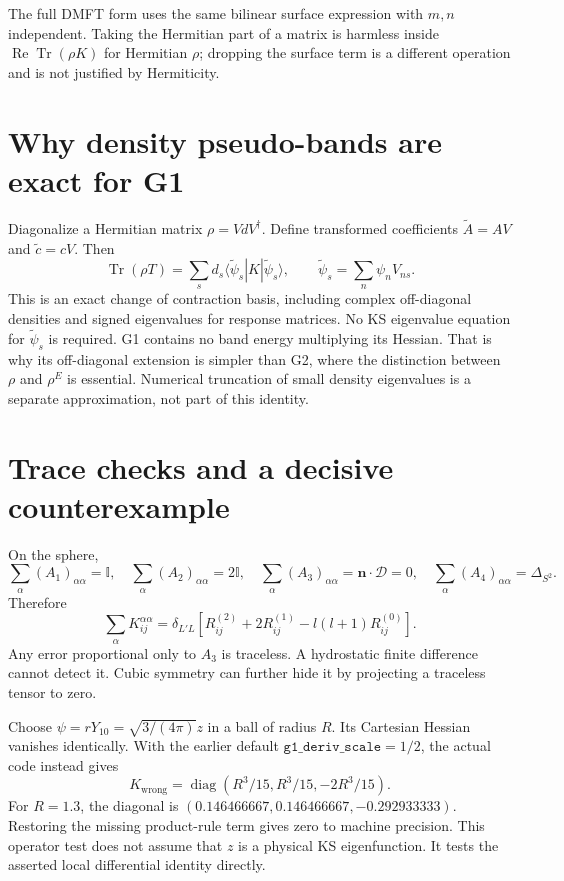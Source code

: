 \documentclass[11pt]{article}
\newcommand{\Tr}{\operatorname{Tr}}
\newcommand{\Rea}{\operatorname{Re}}
\newcommand{\Id}{\mathbb I}
\begin{document}
The full DMFT form uses the same bilinear surface expression with $m,n$ independent. Taking the Hermitian part of a matrix is harmless inside $\Rea\Tr(\rho K)$ for Hermitian $\rho$; dropping the surface term is a different operation and is not justified by Hermiticity.

\section{Why density pseudo-bands are exact for G1}
Diagonalize a Hermitian matrix $\rho=V d V^\dagger$. Define transformed coefficients $\widetilde A=AV$ and $\widetilde c=cV$. Then
\begin{equation}
 \Tr(\rho T)=\sum_s d_s\langle\widetilde\psi_s|\hat K|\widetilde\psi_s\rangle,
 \qquad \widetilde\psi_s=\sum_n\psi_n V_{ns}.
\end{equation}
This is an exact change of contraction basis, including complex off-diagonal densities and signed eigenvalues for response matrices. No KS eigenvalue equation for $\widetilde\psi_s$ is required. G1 contains no band energy multiplying its Hessian. That is why its off-diagonal extension is simpler than G2, where the distinction between $\rho$ and $\rho^E$ is essential. Numerical truncation of small density eigenvalues is a separate approximation, not part of this identity.

\section{Trace checks and a decisive counterexample}
On the sphere,
\begin{equation}
 \sum_\alpha(A_1)_{\alpha\alpha}=\Id,\quad
 \sum_\alpha(A_2)_{\alpha\alpha}=2\Id,\quad
 \sum_\alpha(A_3)_{\alpha\alpha}=\bm n\cdot\bm{\mathcal D}=0,\quad
 \sum_\alpha(A_4)_{\alpha\alpha}=\Delta_{S^2}.
\end{equation}
Therefore
\begin{equation}
 \sum_\alpha K^{\alpha\alpha}_{ij}=\delta_{L'L}
 [R^{(2)}_{ij}+2R^{(1)}_{ij}-l(l+1)R^{(0)}_{ij}].
\end{equation}
Any error proportional only to $A_3$ is traceless. A hydrostatic finite difference cannot detect it. Cubic symmetry can further hide it by projecting a traceless tensor to zero.

Choose $\psi=rY_{10}=\sqrt{3/(4\pi)}z$ in a ball of radius $R$. Its Cartesian Hessian vanishes identically. With the earlier default $\texttt{g1\_deriv\_scale}=1/2$, the actual code instead gives
\begin{equation}
 K_{\mathrm{wrong}}=\operatorname{diag}(R^3/15,R^3/15,-2R^3/15).
\end{equation}
For $R=1.3$, the diagonal is $(0.146466667,0.146466667,-0.292933333)$. Restoring the missing product-rule term gives zero to machine precision. This operator test does not assume that $z$ is a physical KS eigenfunction. It tests the asserted local differential identity directly.
\end{document}
